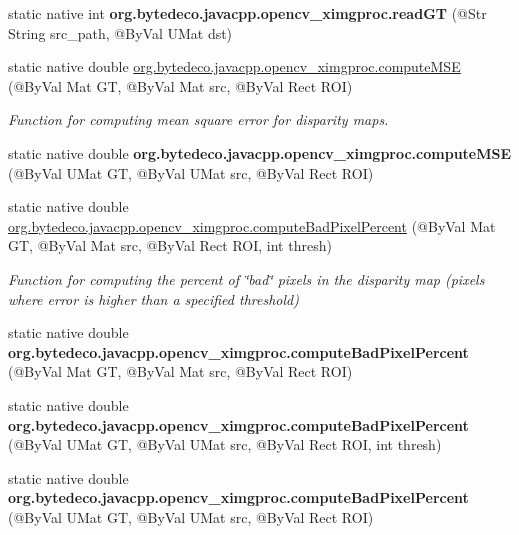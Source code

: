 \begin{DoxyCompactItemize}
static native int {\bfseries org.\+bytedeco.\+javacpp.\+opencv\+\_\+ximgproc.\+read\+GT} (@Str String src\+\_\+path, @By\+Val U\+Mat dst)
\item 
static native double \hyperlink{group__ximgproc__filters_ga0f224e6315d538e257cba2fb7ae0bbee}{org.\+bytedeco.\+javacpp.\+opencv\+\_\+ximgproc.\+compute\+M\+SE} (@By\+Val Mat GT, @By\+Val Mat src, @By\+Val Rect R\+OI)
\begin{DoxyCompactList}\small\item\em Function for computing mean square error for disparity maps. \end{DoxyCompactList}\item 
\mbox{\label{group__ximgproc__filters_gaa5a111b6f736e796e2dcd39708103a9a}} 
static native double {\bfseries org.\+bytedeco.\+javacpp.\+opencv\+\_\+ximgproc.\+compute\+M\+SE} (@By\+Val U\+Mat GT, @By\+Val U\+Mat src, @By\+Val Rect R\+OI)
\item 
static native double \hyperlink{group__ximgproc__filters_ga04b04ac57f6b8c53deacbb1d41d05766}{org.\+bytedeco.\+javacpp.\+opencv\+\_\+ximgproc.\+compute\+Bad\+Pixel\+Percent} (@By\+Val Mat GT, @By\+Val Mat src, @By\+Val Rect R\+OI, int thresh)
\begin{DoxyCompactList}\small\item\em Function for computing the percent of \char`\"{}bad\char`\"{} pixels in the disparity map (pixels where error is higher than a specified threshold) \end{DoxyCompactList}\item 
\mbox{\label{group__ximgproc__filters_ga3b1ead374777b604f8179da429d2a3d9}} 
static native double {\bfseries org.\+bytedeco.\+javacpp.\+opencv\+\_\+ximgproc.\+compute\+Bad\+Pixel\+Percent} (@By\+Val Mat GT, @By\+Val Mat src, @By\+Val Rect R\+OI)
\item 
\mbox{\label{group__ximgproc__filters_gad27163e89fa755060f5a8ff25d212ece}} 
static native double {\bfseries org.\+bytedeco.\+javacpp.\+opencv\+\_\+ximgproc.\+compute\+Bad\+Pixel\+Percent} (@By\+Val U\+Mat GT, @By\+Val U\+Mat src, @By\+Val Rect R\+OI, int thresh)
\item 
\mbox{\label{group__ximgproc__filters_ga550075193f0c2a6513aaad542680a368}} 
static native double {\bfseries org.\+bytedeco.\+javacpp.\+opencv\+\_\+ximgproc.\+compute\+Bad\+Pixel\+Percent} (@By\+Val U\+Mat GT, @By\+Val U\+Mat src, @By\+Val Rect R\+OI)

\end{DoxyCompactItemize}
